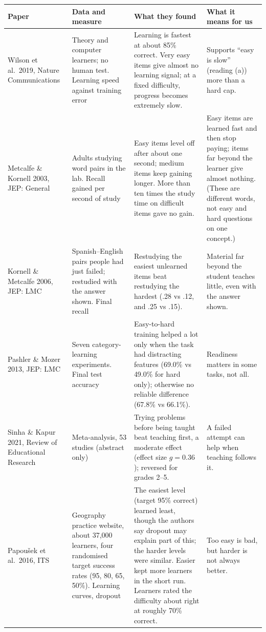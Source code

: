 \documentclass[11pt,a4paper]{article}
\newcommand{\pc}{\%}
\begin{document}
{\small
\setlength{\tabcolsep}{4pt}
\begin{longtable}{>{\raggedright}p{2.7cm}>{\raggedright}p{3.1cm}>{\raggedright}p{5.4cm}>{\raggedright\arraybackslash}p{4.3cm}}
\toprule
Paper & Data and measure & What they found & What it means for us\\
\midrule\endhead
Wilson et al.\ 2019, Nature Communications & Theory and computer learners; no human test. Learning speed against training error & Learning is fastest at about 85\pc{} correct. Very easy items give almost no learning signal; at a fixed difficulty, progress becomes extremely slow. & Supports ``easy is slow'' (reading (a)) more than a hard cap.\\
Metcalfe \& Kornell 2003, JEP: General & Adults studying word pairs in the lab. Recall gained per second of study & Easy items level off after about one second; medium items keep gaining longer. More than ten times the study time on difficult items gave no gain. & Easy items are learned fast and then stop paying; items far beyond the learner give almost nothing. (These are different words, not easy and hard questions on one concept.)\\
Kornell \& Metcalfe 2006, JEP: LMC & Spanish--English pairs people had just failed; restudied with the answer shown. Final recall & Restudying the easiest unlearned items beat restudying the hardest (.28 vs .12, and .25 vs .15). & Material far beyond the student teaches little, even with the answer shown.\\
Pashler \& Mozer 2013, JEP: LMC & Seven category-learning experiments. Final test accuracy & Easy-to-hard training helped a lot only when the task had distracting features (69.0\pc{} vs 49.0\pc{} for hard only); otherwise no reliable difference (67.8\pc{} vs 66.1\pc). & Readiness matters in some tasks, not all.\\
Sinha \& Kapur 2021, Review of Educational Research & Meta-analysis, 53 studies (abstract only) & Trying problems before being taught beat teaching first, a moderate effect (effect size $g = 0.36$); reversed for grades 2--5. & A failed attempt can help when teaching follows it.\\
Papou\v{s}ek et al.\ 2016, ITS & Geography practice website, about 37,000 learners, four randomised target success rates (95, 80, 65, 50\pc). Learning curves, dropout & The easiest level (target 95\pc{} correct) learned least, though the authors say dropout may explain part of this; the harder levels were similar. Easier kept more learners in the short run. Learners rated the difficulty about right at roughly 70\pc{} correct. & Too easy is bad, but harder is not always better.\\

\end{longtable}}
\end{document}

